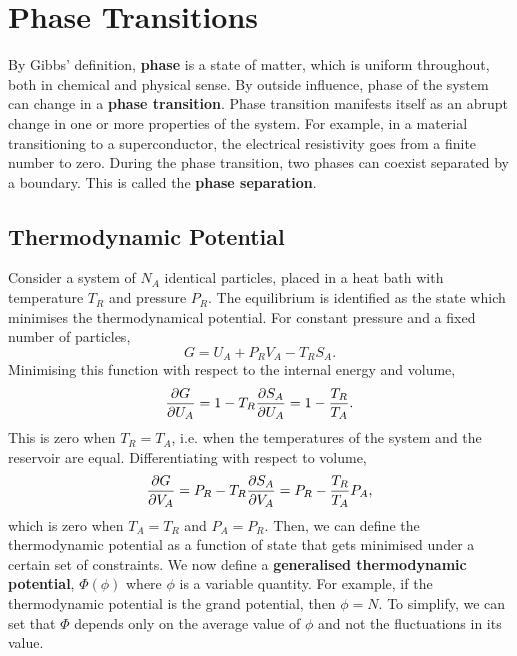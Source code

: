 \chapter{Phase Transitions}
    By Gibbs' definition, \textbf{phase} is a state of matter, which is uniform throughout, both in chemical and physical sense. By outside influence, phase of the system can change in a \textbf{phase transition}. Phase transition manifests itself as an abrupt change in one or more properties of the system. For example, in a material transitioning to a superconductor, the electrical resistivity goes from a finite number to zero. During the phase transition, two phases can coexist separated by a boundary. This is called the \textbf{phase separation}. 
    \section{Thermodynamic Potential}
        Consider a system of $N_A$ identical particles, placed in a heat bath with temperature $T_R$ and pressure $P_R$. The equilibrium is identified as the state which minimises the thermodynamical potential. For constant pressure and a fixed number of particles,\begin{equation}
            G = U_A + P_RV_A-T_RS_A.
        \end{equation}
        Minimising this function with respect to the internal energy and volume,
        \begin{equation}
            \frac{\partial G}{\partial U_A} = 1 - T_R \frac{\partial S_A}{\partial U_A} = 1-\frac{T_R}{T_A}.
        \end{equation}
        This is zero when $T_R=T_A$, i.e. when the temperatures of the system and the reservoir are equal. Differentiating with respect to volume,
        \begin{equation}
            \frac{\partial G}{\partial V_A} = P_R -T_R \frac{\partial S_A}{\partial V_A}=P_R-\frac{T_R}{T_A}P_A,
        \end{equation}
        which is zero when $T_A=T_R$ and $P_A=P_R$. Then, we can define the thermodynamic potential as a function of state that gets minimised under a certain set of constraints. We now define a \textbf{generalised thermodynamic potential}, $\Phi(\phi)$ where $\phi$ is a variable quantity. For example, if the thermodynamic potential is the grand potential, then $\phi = N$. To simplify, we can set that $\Phi$ depends only on the average value of $\phi$ and not the fluctuations in its value. \\
        \\

